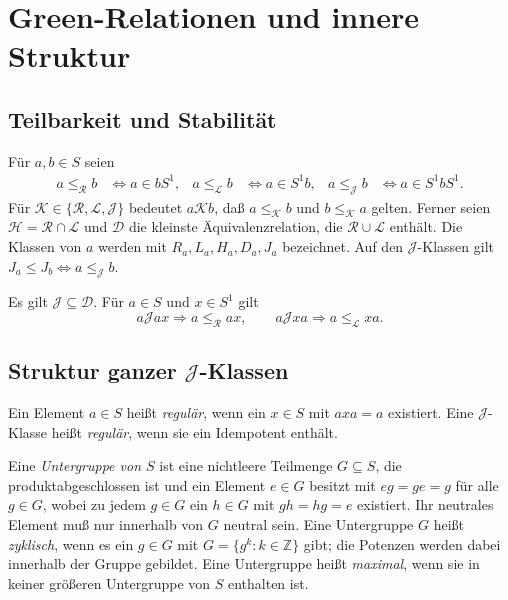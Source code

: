 \chapter{Green-Relationen und innere Struktur}
\label{b37guide:chap:green}

\section{Teilbarkeit und Stabilität}

\begin{definition}
Für $a,b\in S$ seien
\[
\begin{aligned}
a\leq_{\mathcal R}b&\iff a\in bS^1,&
a\leq_{\mathcal L}b&\iff a\in S^1b,&
a\leq_{\mathcal J}b&\iff a\in S^1bS^1.
\end{aligned}
\]
Für $\mathcal K\in\{\mathcal R,\mathcal L,\mathcal J\}$ bedeutet
$a\mathrel{\mathcal K}b$, daß $a\leq_{\mathcal K}b$ und
$b\leq_{\mathcal K}a$ gelten. Ferner seien
$\mathcal H=\mathcal R\cap\mathcal L$ und $\mathcal D$ die kleinste
Äquivalenzrelation, die $\mathcal R\cup\mathcal L$ enthält.
Die Klassen von $a$ werden mit $R_a,L_a,H_a,D_a,J_a$ bezeichnet.
Auf den $\mathcal J$-Klassen gilt
$J_a\leq J_b\iff a\leq_{\mathcal J}b$.
\end{definition}

\begin{theorem}
\label{b37guide:thm:stability}
Es gilt $\mathcal J\subseteq\mathcal D$. Für $a\in S$ und $x\in S^1$ gilt
\[
a\mathrel{\mathcal J}ax\Longrightarrow a\leq_{\mathcal R}ax,
\qquad
a\mathrel{\mathcal J}xa\Longrightarrow a\leq_{\mathcal L}xa.
\]
\cite{pin,donoven2018}
\end{theorem}

\section{Struktur ganzer \texorpdfstring{$\mathcal J$}{J}-Klassen}

\begin{definition}
Ein Element $a\in S$ heißt \emph{regulär}, wenn ein $x\in S$ mit
$axa=a$ existiert. Eine $\mathcal J$-Klasse heißt \emph{regulär}, wenn
sie ein Idempotent enthält.

Eine \emph{Untergruppe von $S$} ist eine nichtleere Teilmenge $G\subseteq S$,
die produktabgeschlossen ist und ein Element $e\in G$ besitzt mit
$eg=ge=g$ für alle $g\in G$, wobei zu jedem $g\in G$ ein $h\in G$
mit $gh=hg=e$ existiert.
Ihr neutrales Element muß nur innerhalb von $G$ neutral sein.
Eine Untergruppe $G$ heißt \emph{zyklisch}, wenn es ein $g\in G$
mit $G=\{g^k:k\in\mathbb Z\}$ gibt; die Potenzen werden dabei
innerhalb der Gruppe gebildet.
Eine Untergruppe heißt \emph{maximal}, wenn sie in keiner größeren
Untergruppe von $S$ enthalten ist.
\end{definition}


